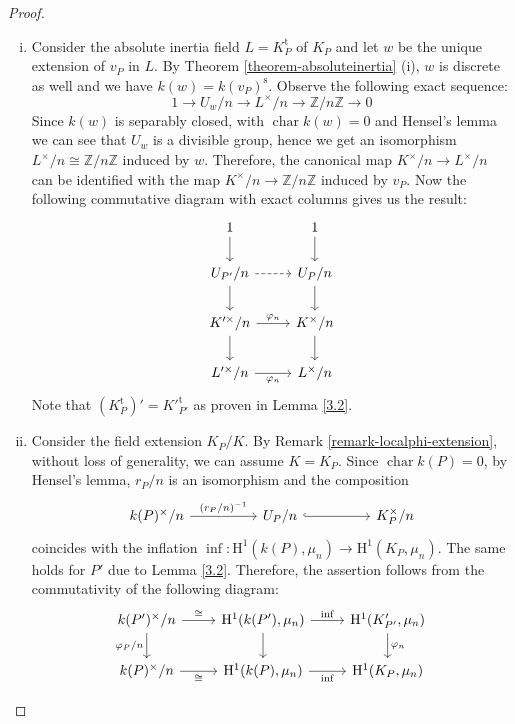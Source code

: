 \begin{proof}
\begin{enumerate}[(i)]
\item Consider the absolute inertia field $L = K_P^\text{t}$ of $K_P$ and let $w$ be the unique extension of $v_P$ in $L$. By Theorem \ref{theorem-absoluteinertia} (i), $w$ is discrete as well and we have $k(w) = k(v_P)^\text{s}$. Observe the following exact sequence:
\[ 1 \longrightarrow U_w/n \longrightarrow L^\times /n\longrightarrow \mathbb{Z}/n\mathbb{Z}\longrightarrow 0 \]
Since $k(w)$ is separably closed, with $\operatorname{char} k(w)=0$ and Hensel's lemma we can see that $U_w$ is a divisible group, hence we get an isomorphism $L^\times /n\cong \mathbb{Z}/n\mathbb{Z}$ induced by $w$. Therefore, the canonical map $K^\times/n\to L^\times/n$ can be identified with the map $K^\times/n \to\mathbb{Z}/n\mathbb{Z}$ induced by $v_P$. Now the following commutative diagram with exact columns gives us the result:
\[ \begin{tikzcd}
1 \ar[d] & 1 \ar[d]\\
U_{P'}/n \ar[r, dashed]\ar[d] & U_P/n\ar[d]\\
K'^\times /n \ar[r, "\varphi_n"]\ar[d] & K^\times/n\ar[d]\\
L'^\times /n \ar[r, "\varphi_n"'] &  L^\times /n
\end{tikzcd}\]
Note that $(K^\text{t}_P)' = K'^{\text{t}}_{P'}$ as proven in Lemma \ref{3.2}.
\item Consider the field extension $K_P/K$. By Remark \ref{remark-localphi-extension}, without loss of generality, we can assume $K=K_P$. Since $\operatorname{char}k(P)=0$, by Hensel's lemma, $r_P/n$ is an isomorphism and the composition
\[\begin{tikzcd}
k(P)^\times / n\ar[rr, "(r_P/n)^{-1}"] && U_P/n \ar[rr, hook] && K_P^\times/n
\end{tikzcd}\]
coincides with the inflation $\operatorname{inf}: \mathrm{H}^1(k(P), \mu_n) \to \mathrm{H}^1(K_P,\mu_n)$. The same holds for $P'$ due to Lemma \ref{3.2}. Therefore, the assertion follows from the commutativity of the following diagram:
\[ \begin{tikzcd}
k(P')^\times/n \ar[r, "\cong"] \ar[d, "\varphi_P/n"'] & \mathrm{H}^1(k(P'),\mu_n) \ar[r, "\mathrm{inf}"] \ar[d]& \mathrm{H}^1(K'_{P'}, \mu_n) \ar[d, "\varphi_n"] \\
k(P)^\times/n \ar[r, "\cong"'] & \mathrm{H}^1(k(P),\mu_n)  \ar[r, "\mathrm{inf}"'] & \mathrm{H}^1(K_{P}, \mu_n)
\end{tikzcd}  \qedhere\]
\end{enumerate}
\end{proof}

